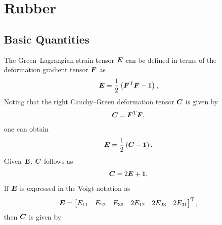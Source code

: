 \chapter{Rubber}
\section{Basic Quantities}
The Green--Lagrangian strain tensor $\bm{E}$ can be defined in terms of the deformation gradient tensor $\bm{F}$ as
\begin{gather}
    \bm{E}=\dfrac{1}{2}\left(\bm{F}^{\mathrm{T}}\bm{F}-\bm{1}\right),
\end{gather}
Noting that the right Cauchy--Green deformation tensor $\bm{C}$ is given by
\begin{gather}
    \bm{C}=\bm{F}^{\mathrm{T}}\bm{F},
\end{gather}
one can obtain
\begin{gather}
    \bm{E}=\dfrac{1}{2}\left(\bm{C}-\bm{1}\right).
\end{gather}
Given $\bm{E}$, $\bm{C}$ follows as
\begin{gather}
    \bm{C}=2\bm{E}+\bm{1}.
\end{gather}
If $\bm{E}$ is expressed in the Voigt notation as
\begin{gather}
    \bm{E}=\begin{bmatrix}
        E_{11} & E_{22} & E_{33} & 2E_{12} & 2E_{23} & 2E_{31}
    \end{bmatrix}^{\mathrm{T}},
\end{gather}
then $\bm{C}$ is given by
